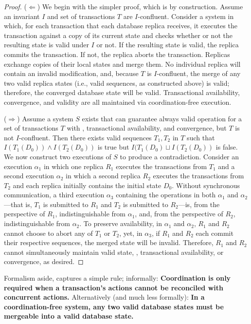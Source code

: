 \begin{proof}
($\Leftarrow$) We begin with the simpler proof, which is by
  construction. Assume an invariant $I$ and set of transactions $T$
  are $I$-confluent. Consider a system in which, for each transaction
  that each database replica receives, it executes the transaction
  against a copy of its current state and checks whether or not the
  resulting state is valid under $I$ or not. If the resulting state is
  valid, the replica commits the transaction. If not, the replica
  aborts the transaction. Replicas exchange copies of their local
  states and merge them. No individual replica will contain an invalid
  modification, and, because $T$ is $I$-confluent, the merge of any
  two valid replica states (i.e., valid sequences, as constructed
  above) is valid; therefore, the converged database state will be
  valid. Transactional availability, convergence, and validity are all
  maintained via coordination-free execution.

($\Rightarrow$) Assume a system $S$ exists that can guarantee always
  valid operation for a set of transactions $T$ with \cfreedom,
  transactional availability, and convergence, but $T$ is not
  $I$-confluent. Then there exists valid sequences $T_1,T_2$ in $T$
  such that $I(T_1(D_0)) \wedge I(T_2(D_0))$ is true but $I(T_1(D_0)
  \sqcup I(T_2(D_0))$ is false. We now construct two executions of $S$
  to produce a contradiction. Consider an execution $\alpha_1$ in
  which one replica $R_1$ executes the transactions from $T_1$ and a
  second execution $\alpha_2$ in which a second replica $R_2$ executes
  the transactions from $T_2$ and each replica initially contains the
  initial state $D_0$. Without synchronous communication, a third
  execution $\alpha_3$ containing the operations in both $\alpha_1$
  and $\alpha_2$---that is, $T_1$ is submitted to $R_1$ and $T_2$ is
  submitted to $R_2$---is, from the perspective of $R_1$,
  indistinguishable from $\alpha_1$, and, from the perspective of
  $R_2$, indistinguishable from $\alpha_2$. To preserve availability,
  in $\alpha_1$ and $\alpha_2$, $R_1$ and $R_2$ cannot choose to abort
  any of $T_1$ or $T_2$, yet, in $\alpha_3$, if $R_1$ and $R_2$ each
  commit their respective sequences, the merged state will be
  invalid. Therefore, $R_1$ and $R_2$ cannot simultaneously maintain
  valid state, \cfreedom, transactional availability, or convergence,
  as desired.
\end{proof}

Formalism aside, \iconfluence captures a simple rule; informally:
\textbf{Coordination is only required when a transaction's actions
  cannot be reconciled with concurrent actions.}  Alternatively (and
much less formally): \textbf{In a coordination-free system, any two
  valid database states must be mergeable into a valid database
  state.}

